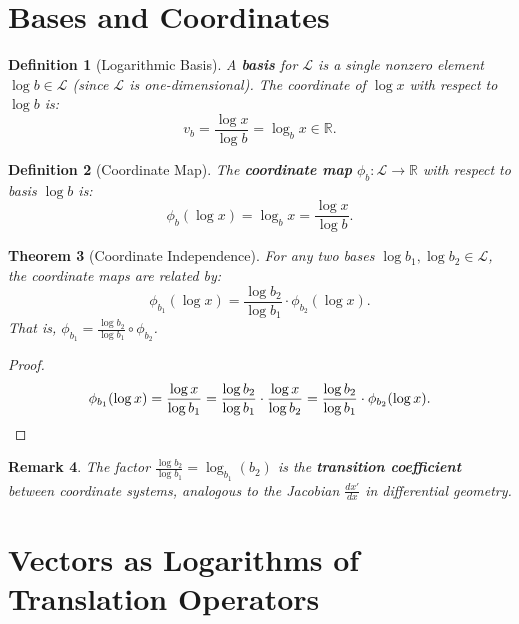 \documentclass[11pt]{article}
\newtheorem{definition}{Definition}[section]
\newtheorem{theorem}[definition]{Theorem}
\newtheorem{remark}[definition]{Remark}
\begin{document}
\section{Bases and Coordinates}
\label{sec:bases}

\begin{definition}[Logarithmic Basis]
A \textbf{basis} for $\mathcal{L}$ is a single nonzero element $\log b \in \mathcal{L}$ (since $\mathcal{L}$ is one-dimensional). The coordinate of $\log x$ with respect to $\log b$ is:
\[
v_b = \frac{\log x}{\log b} = \log_b x \in \mathbb{R}.
\]
\end{definition}

\begin{definition}[Coordinate Map]
The \textbf{coordinate map} $\phi_b: \mathcal{L} \to \mathbb{R}$ with respect to basis $\log b$ is:
\[
\phi_b(\log x) = \log_b x = \frac{\log x}{\log b}.
\]
\end{definition}

\begin{theorem}[Coordinate Independence]
For any two bases $\log b_1, \log b_2 \in \mathcal{L}$, the coordinate maps are related by:
\[
\phi_{b_1}(\log x) = \frac{\log b_2}{\log b_1} \cdot \phi_{b_2}(\log x).
\]
That is, $\phi_{b_1} = \frac{\log b_2}{\log b_1} \circ \phi_{b_2}$.
\end{theorem}

\begin{proof}
\[
\phi_{b_1}(\log x) = \frac{\log x}{\log b_1} = \frac{\log b_2}{\log b_1} \cdot \frac{\log x}{\log b_2} = \frac{\log b_2}{\log b_1} \cdot \phi_{b_2}(\log x). \qedhere
\]
\end{proof}

\begin{remark}
The factor $\frac{\log b_2}{\log b_1} = \log_{b_1}(b_2)$ is the \textbf{transition coefficient} between coordinate systems, analogous to the Jacobian $\frac{dx'}{dx}$ in differential geometry.
\end{remark}

\section{Vectors as Logarithms of Translation Operators}
\label{sec:vectors-as-logs}
\end{document}
